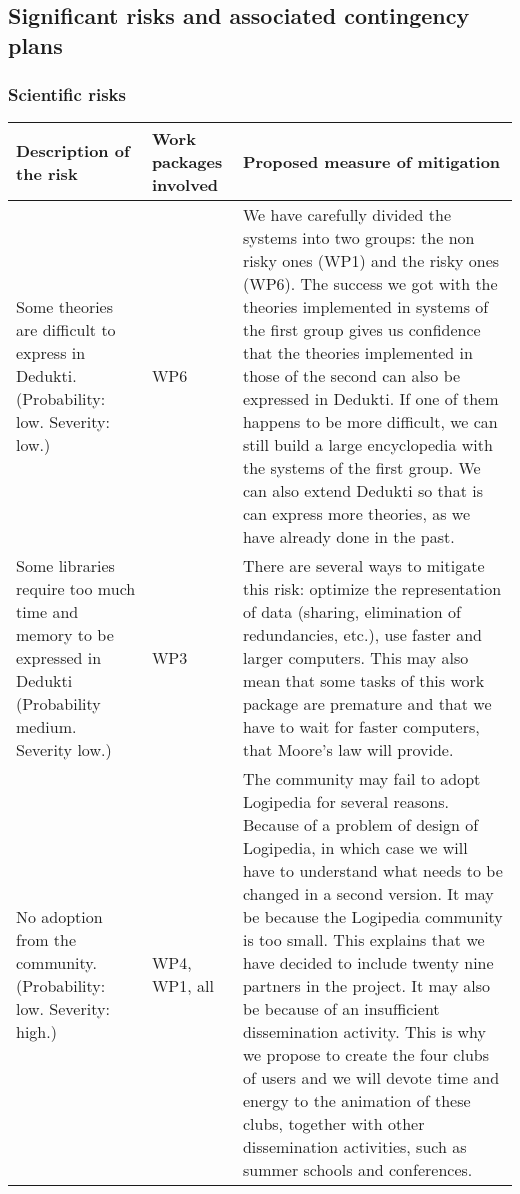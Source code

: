 \subsection{Significant risks and associated contingency plans}\label{sec:risks}

\subsubsection*{Scientific risks}

\begin{longtable}{|p{}|p{}|p{}|}
\hline
{\bf Description of the risk}
&
{\bf Work packages involved}
&
{\bf Proposed measure of mitigation}
\\
\hline
Some theories are difficult to express in Dedukti.
(Probability: low. Severity: low.)
&
WP6
&
We have carefully divided the systems into two groups: the non risky
ones (WP1) and the risky ones (WP6). The success we got with the
theories implemented in systems of the first group gives us confidence
that the theories implemented in those of the second can also be
expressed in Dedukti.  If one of them happens to be more difficult, we
can still build a large encyclopedia with the systems of the first
group. We can also extend Dedukti so that is can express more theories,
as we have already done in the past.
\\
\hline
Some libraries require too much time and memory
to be expressed in Dedukti (Probability medium. Severity low.)
&
WP3
&
There are several ways to mitigate this risk: optimize the
representation of data (sharing, elimination of redundancies, etc.), 
use faster and larger computers. This may also mean that some tasks
of this work package are premature and that we have to wait for
faster computers, that Moore's law will provide.
\\
\hline
No adoption from the community. (Probability: low. Severity: high.)
&
WP4, WP1, all 
&
The community may fail to adopt Logipedia for several reasons. Because
of a problem of design of Logipedia, in which case we will have to
understand what needs to be changed in a second version.  It may be
because the Logipedia community is too small.  This explains that we
have decided to include twenty nine partners in the project.  It may
also be because of an insufficient dissemination activity.  This is
why we propose to create the four clubs of users and we will devote
time and energy to the animation of these clubs, together with other
dissemination activities, such as summer schools and conferences.
\\
\hline
\end{longtable}

